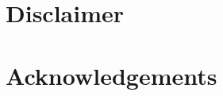 \documentclass{report}
\begin{document}
\section*{Disclaimer}

\section*{Acknowledgements}

\newpage

\singlespacing{}

\doublespacing{}
\tableofcontents
\singlespacing{}
\newpage

\onehalfspacing

\titlespacing*{\chapter}{0pt}{40pt}{40pt}







\begin{appendix}
    \centering
    
    
\end{appendix}
\end{document}
